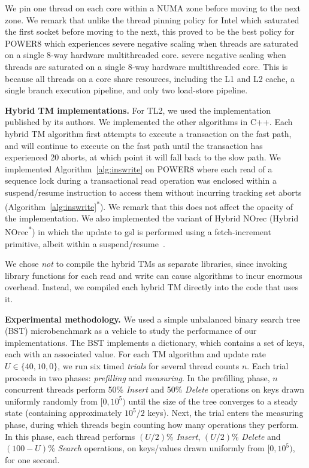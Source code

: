We pin one thread on each core within a NUMA zone before moving to the next zone.
We remark that unlike the thread pinning policy for Intel which saturated the first socket before moving to the next, this proved to be the best policy
for POWER8 which experiences severe negative scaling when threads are saturated on a single 8-way hardware multithreaded core.
severe negative scaling when threads are saturated on a single 8-way hardware multithreaded core. 
This is because all threads on a core share resources, including the L1 and L2 cache, a single branch execution pipeline, 
and only two load-store pipeline.

\vspace{1mm}\noindent\textbf{Hybrid TM implementations.}
For TL2, we used the implementation published by its authors.
We implemented the other algorithms in C++.
Each hybrid TM algorithm first attempts to execute a transaction on the fast path, and will continue to execute on the fast path until the transaction has experienced 20 aborts, at which point it will fall back to the slow path.
We implemented Algorithm~\ref{alg:inswrite} on POWER8 where each read of a sequence lock during a transactional read operation was enclosed within a suspend/resume instruction to access them without 
incurring tracking set aborts (Algorithm~\ref{alg:inswrite}\textsuperscript{$\ast$}). We remark that this does not affect the opacity of the implementation. 
We also implemented the variant of Hybrid NOrec (Hybrid NOrec\textsuperscript{$\ast$}) in which the update to gsl is performed using a fetch-increment primitive, albeit within a suspend/resume~\cite{hynorecriegel}. 

We chose \textit{not} to compile the hybrid TMs as separate libraries, since invoking library functions for each read and write can cause algorithms to incur enormous overhead.
Instead, we compiled each hybrid TM directly into the code that uses it.

\vspace{1mm}\noindent\textbf{Experimental methodology.}
We used a simple unbalanced binary search tree (BST) microbenchmark as a vehicle to study the performance of our implementations.
The BST implements a dictionary, which contains a set of keys, each with an associated value.
For each TM algorithm %
and update rate $U \in \{40, 10, 0\}$, we run six timed \textit{trials} for several thread counts $n$.
Each trial proceeds in two phases: \textit{prefilling} and \textit{measuring}.
In the prefilling phase, $n$ concurrent threads perform 50\% \textit{Insert} and 50\% \textit{Delete} operations on keys drawn uniformly randomly from $[0, 10^5)$ until the size of the tree converges to a steady state (containing approximately $10^5/2$ keys).
Next, the trial enters the measuring phase, during which threads begin counting how many operations they perform.
In this phase, each thread performs $(U/2)$\% \textit{Insert}, $(U/2)$\% \textit{Delete} and $(100-U)$\% \textit{Search} operations, on keys/values drawn uniformly from $[0,10^5)$, for one second.

